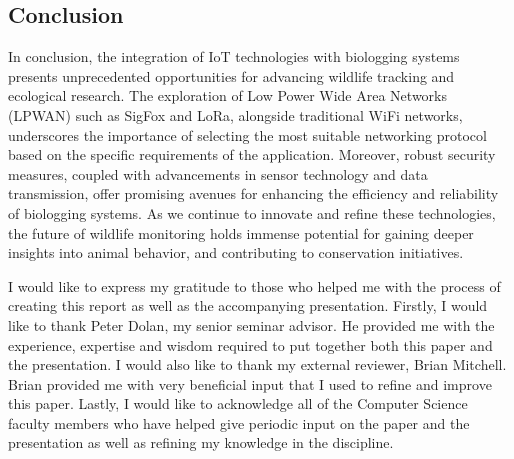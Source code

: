 \documentclass[sigplan,screen,nonacm]{acmart}
\begin{document}
\subsection{Conclusion}
\label{sec:Conclusion}

In conclusion, the integration of IoT technologies with biologging systems presents unprecedented opportunities for 
advancing wildlife tracking and ecological research. The exploration of Low Power Wide Area Networks (LPWAN) such 
as SigFox and LoRa, alongside traditional WiFi networks, underscores the importance of selecting the most suitable 
networking protocol based on the specific requirements of the application. Moreover, robust security measures, coupled 
with advancements in sensor technology and data transmission, offer promising avenues for enhancing the efficiency 
and reliability of biologging systems. As we continue to innovate and refine these technologies, the future of 
wildlife monitoring holds immense potential for gaining deeper insights into animal behavior, and contributing to 
conservation initiatives.

\begin{acks}
  I would like to express my gratitude to those who helped me with the process of creating this report as well as the 
  accompanying presentation. Firstly, I would like to thank Peter Dolan, my senior seminar advisor. He provided me with 
  the experience, expertise and wisdom required to put together both this paper and the presentation. I would also like 
  to thank my external reviewer, Brian Mitchell. Brian provided me with very beneficial input that I used to refine and improve 
  this paper. Lastly, I would like to acknowledge all of the Computer Science faculty members who have helped give periodic input 
  on the paper and the presentation as well as refining my knowledge in the discipline.
\end{acks}



\end{document}
